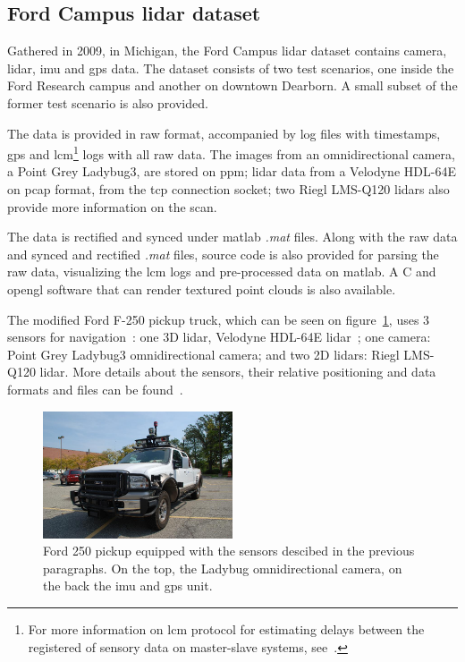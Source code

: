 \subsection{Ford Campus \ac{lidar} dataset}
Gathered in 2009, in Michigan, the Ford Campus \ac{lidar} dataset contains camera, \ac{lidar}, \ac{imu} and \ac{gps} data. The dataset consists of two test scenarios, one inside the Ford Research campus and another on downtown Dearborn. A small subset of the former test scenario is also provided.

The data is provided in raw format, accompanied by log files with timestamps, \ac{gps} and \ac{lcm}\footnote{For more information on \acf{lcm} protocol for estimating delays between the registered of sensory data on master-slave systems, see~\cite{VelodyneHDL64}.} logs with all raw data. The images from an omnidirectional camera, a Point Grey Ladybug3, are stored on \ac{ppm}; \ac{lidar} data from a Velodyne HDL-64E on \ac{pcap} format, from the \ac{tcp} connection socket; two Riegl LMS-Q120 \acp{lidar} also provide more information on the scan.

The data is rectified and synced under \ac{matlab} \textit{.mat} files. Along with the raw data and synced and rectified \textit{.mat} files, source code is also provided for parsing the raw data, visualizing the \ac{lcm} logs and pre-processed data on \ac{matlab}. A C and \ac{opengl} software that can render textured point clouds is also available.

The modified Ford F-250 pickup truck, which can be seen on figure~\ref{fig:sota:ford_sensors}, uses 3 sensors for navigation~\cite{Pandey2011}: one 3D \ac{lidar}, Velodyne HDL-64E \ac{lidar}~\cite{VelodyneHDL64}; one camera: Point Grey Ladybug3 omnidirectional camera; and two 2D \acp{lidar}: Riegl LMS-Q120 lidar. More details about the sensors, their relative positioning and data formats and files can be found~\cite{Pandey2011}.

\begin{figure}
	\centering
	\includegraphics[width=0.5\textwidth]{img/sensor_fusion/ford_sensors.jpg}
	\caption{Ford 250 pickup equipped with the sensors descibed in the previous paragraphs. On the top, the Ladybug omnidirectional camera, on the back the \ac{imu} and \ac{gps} unit. }
	\label{fig:sota:ford_sensors}
\end{figure}


